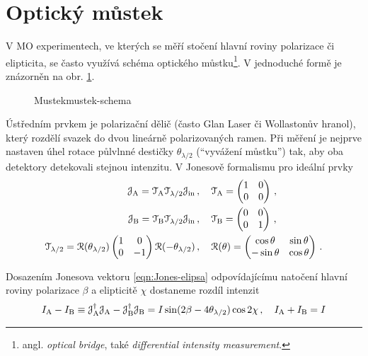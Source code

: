 \section{Optický můstek}
\label{chap:mustek-kap2}
V MO experimentech, ve kterých se měří stočení hlavní roviny polarizace či elipticita, se často využívá schéma optického můstku\footnote{angl. \emph{optical bridge}, také \emph{differential intensity measurement}.}\cite{silberQuadraticMagnetoopticKerr2019a}.
V jednoduché formě je znázorněn na obr. \ref{fig:mustek-schema}.

\begin{figure}[htbp]
    \centering
    \caption{Mustekmustek-schema}
    \label{fig:mustek-schema}
\end{figure}

Ústředním prvkem je polarizační dělič (často Glan Laser či Wollastonův hranol), který rozdělí svazek do dvou lineárně polarizovaných ramen.
Při měření je nejprve nastaven úhel rotace půlvlnné destičky $\theta_{\lambda/2}$ (``vyvážení můstku'') tak, aby oba detektory detekovali stejnou intenzitu.
V Jonesově formalismu pro ideální prvky
\begin{align}
    \mathcal{J}_\textrm{A} = \mathcal{T}_\textrm{A} \mathcal{T}_{\lambda/2} \mathcal{J}_\textrm{in} \,&, \quad 
    \mathcal{T}_\textrm{A}=\begin{pmatrix} 1&0\\0&0 \end{pmatrix} \,, \\
    \mathcal{J}_\textrm{B} = \mathcal{T}_\textrm{B} \mathcal{T}_{\lambda/2} \mathcal{J}_\textrm{in} \,&, \quad
    \mathcal{T}_\textrm{B}=\begin{pmatrix} 0&0\\0&1 \end{pmatrix} \,,\\
    \mathcal{T}_{\lambda/2}=\mathcal{R}(\theta_{\lambda/2})\begin{pmatrix} 1&0\\0&-1 \end{pmatrix}\mathcal{R}(-\theta_{\lambda/2}) \,&, \quad
    \mathcal{R}(\theta)=\begin{pmatrix} \cos\theta&\sin\theta\\-\sin\theta&\cos\theta \end{pmatrix} \,.
\end{align}

Dosazením Jonesova vektoru \eqref{eqn:Jones-elipsa} odpovídajícímu natočení hlavní roviny polarizace $\beta$ a elipticitě $\chi$ dostaneme rozdíl intenzit
\begin{equation}
    I_\textrm{A}-I_\textrm{B}\equiv\mathcal{J}_\textrm{A}^\dagger\mathcal{J}_\textrm{A}-\mathcal{J}_\textrm{B}^\dagger\mathcal{J}_\textrm{B}=I\sin(2\beta-4\theta_{\lambda/2})\cos2\chi \,, \quad I_\textrm{A}+I_\textrm{B}=I
\end{equation}

